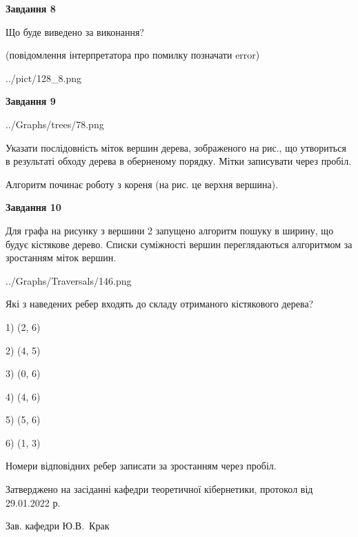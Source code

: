 \documentclass[12pt, ukrainian]{article}
\begin{document}
{\begin {large}
{\begin {center}\textbf{Завдання 8}\end {center}}\par
Що буде виведено за виконання?\par
 (повідомлення інтерпретатора про помилку позначати error)\par
\begin{center}
	{../pict/128_8.png}
\end{center}
\newpage

{\begin {center}\textbf{Завдання 9}\end {center}}\par

\begin{center}
	{../Graphs/trees/78.png}
\end{center}
Указати послідовність міток вершин дерева, зображеного на рис., що утвориться в результаті обходу дерева в оберненому порядку. Мітки записувати через пробіл.\par Алгоритм починає роботу з кореня (на рис. це верхня вершина).\par
\newpage

{\begin {center}\textbf{Завдання 10}\end {center}}\par
Для графа на рисунку з вершини 2 запущено алгоритм пошуку в ширину, що будує кістякове дерево. Списки суміжності вершин переглядаються алгоритмом за зростанням міток вершин.\par
\begin{center}
	{../Graphs/Traversals/146.png}
\end{center}
\par Які з наведених ребер входять до складу отриманого кістякового дерева?\par
1) (2, 6)\par
2) (4, 5)\par
3) (0, 6)\par
4) (4, 6)\par
5) (5, 6)\par
6) (1, 3)\par
{\vskip 15pt} Номери відповідних ребер записати за зростанням через пробіл.\par
\newpage


\end {large}
}
{\smallskip \begin {small} Затверджено на засіданні кафедри теоретичної кібернетики, протокол  від   29.01.2022 р.\par\smallskip\smallskip
{\parbox {6.5 cm}{Зав. кафедри \dotfill Ю.В.~Крак}} \end{small}}
\end{document}

